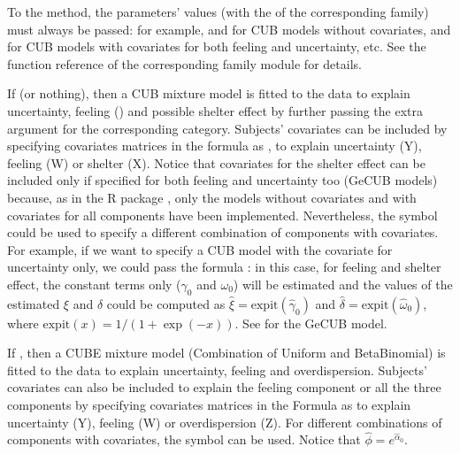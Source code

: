 \documentclass[letterpaper,10pt,english]{sphinxmanual}
\begin{document}
\sphinxAtStartPar
To the  method, the parameters’ values (with the  of the corresponding
family) must always be passed:
for example,  and  for CUB models without covariates,  and 
for CUB models with covariates for both feeling and uncertainty, etc. See the
 function reference of the corresponding family module for details.

\sphinxAtStartPar
If   (or nothing), then a CUB mixture model is fitted to the data to explain uncertainty,
feeling () and possible shelter effect by further passing the extra argument  for the corresponding category.
Subjects’ covariates can be included by specifying covariates matrices in the
formula as ,  to explain uncertainty (Y), feeling (W) or shelter (X).
Notice that
covariates for the shelter effect can be included only if specified for both feeling and uncertainty too (GeCUB models)
because, as in the R package , only the models without covariates and with covariates for all components
have been implemented.
Nevertheless, the symbol  could be used to specify a different combination of components with covariates.
For example, if we want to specify a CUB model with the covariate  for uncertainty only, we could pass the
formula : in this case, for feeling and shelter effect, the constant terms only
(\(\gamma_0\) and \(\omega_0\)) will be estimated and the values of the estimated \(\xi\) and
\(\delta\) could be computed as \(\hat\xi=\mathrm{expit}(\hat\gamma_0)\) and
\(\hat\delta=\mathrm{expit}(\hat\omega_0)\), where \(\mathrm{expit}(x) = 1 / (1 + \exp(-x))\).
See {\hyperref[\detokenize{manual:cubsh-with-covariates}]{}} for the GeCUB model.

\sphinxAtStartPar
If , then a CUBE mixture model (Combination of Uniform and Beta\sphinxhyphen{}Binomial) is fitted to the data
to explain uncertainty, feeling and overdispersion. Subjects’ covariates can also be included to explain the
feeling component or all the three components by  specifying covariates matrices in the Formula as
 to explain uncertainty (Y), feeling (W) or
overdispersion (Z). For different combinations of components with covariates, the symbol  can be used.
Notice that \(\hat\phi=e^{\hat\alpha_0}\).
\end{document}
